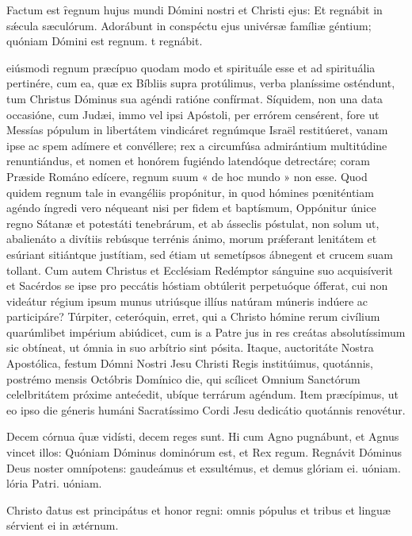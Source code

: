 \documentclass[fontsize=8pt,paper=A6,twoside,BCOR=1mm,DIV=22,headinclude]{scrarticle}
\begin{document}
\begin{multicols}{2}
{
\R Factum est \f regnum hujus mundi Dómini nostri et Christi ejus:
\red{*} Et regnábit in sǽcula sæculórum.
\V Adorábunt in conspéctu ejus univérsæ famíliæ géntium; quóniam Dómini est regnum.
t regnábit.

 eiúsmodi regnum præcípuo quodam modo et spirituále esse et ad spirituália pertinére, cum ea, quæ ex Bíbliis supra protúlimus, verba planíssime osténdunt, tum Christus Dóminus sua agéndi ratióne confírmat.
Síquidem, non una data occasióne, cum Judæi, immo vel ipsi Apóstoli, per errórem censérent, fore ut Messías pópulum in libertátem vindicáret regnúmque Israël restitúeret, vanam ipse ac spem adímere et convéllere; rex a circumfúsa admirántium multitúdine renuntiándus, et nomen et honórem fugiéndo latendóque detrectáre; coram Præside Románo edícere, regnum suum « de hoc mundo » non esse.
Quod quidem regnum tale in evangéliis propónitur, in quod hómines pœniténtiam agéndo íngredi vero néqueant nisi per fidem et baptísmum, Oppónitur únice regno Sátanæ et potestáti tenebrárum, et ab ásseclis póstulat, non solum ut, abalienáto a divítiis rebúsque terrénis ánimo, morum prǽferant lenitátem et esúriant sitiántque justítiam, sed étiam ut semetípsos ábnegent et crucem suam tollant. Cum autem Christus et Ecclésiam Redémptor sánguine suo acquisíverit et Sacérdos se ipse pro peccátis hóstiam obtúlerit perpetuóque ófferat, cui non videátur régium ipsum munus utriúsque illíus natúram múneris indúere ac participáre? Túrpiter, ceteróquin, erret, qui a Christo hómine rerum civílium quarúmlibet impérium abiúdicet, cum is a Patre jus in res creátas absolutíssimum sic obtíneat, ut ómnia in suo arbítrio sint pósita.
Itaque, auctoritáte Nostra Apostólica, festum Dómni Nostri Jesu Christi Regis institúimus, quotánnis, postrémo mensis Octóbris Domínico die, qui scílicet Omnium Sanctórum celelbritátem próxime antećedit, ubíque terrárum agéndum. Item præcípimus, ut eo ipso die géneris humáni Sacratíssimo Cordi Jesu dedicátio quotánnis renovétur.

\R Decem córnua \f quæ vidísti, decem reges sunt. Hi cum Agno pugnábunt, et Agnus vincet illos:
\red{*} Quóniam Dóminus dominórum est, et Rex regum.
\V Regnávit Dóminus Deus noster omnípotens: gaudeámus et exsultémus, et demus glóriam ei.
uóniam.
lória Patri.
uóniam.

}


\A Christo \f datus est principátus et honor regni: omnis pópulus et tribus et linguæ sérvient ei in ætérnum.


\end{multicols}
\end{document}

